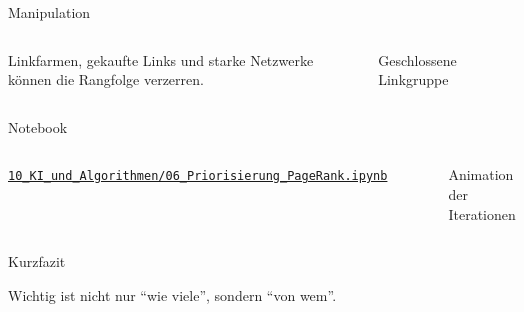 \begin{frame}{Manipulation}
    \begin{columns}
        \begin{mycaution}
            Linkfarmen, gekaufte Links und starke Netzwerke können die Rangfolge verzerren.
        \end{mycaution}
        \begin{figure}[H]
            \centering
            \caption*{Geschlossene Linkgruppe}
        \end{figure}
    \end{columns}
\end{frame}

\begin{frame}{Notebook}
    \begin{columns}
        \begin{myremark}
            \href{https://cyrilblum.github.io/FreeFlower/jupyter/}{\texttt{10\_KI\_und\_Algorithmen/06\_Priorisierung\_PageRank.ipynb}}
        \end{myremark}
        \begin{figure}[H]
            \centering
            \caption*{Animation der Iterationen}
        \end{figure}
    \end{columns}
\end{frame}

\begin{frame}{Kurzfazit}
    \begin{center}
        \Large Wichtig ist nicht nur \enquote{wie viele}, sondern \enquote{von wem}.
    \end{center}
\end{frame}
